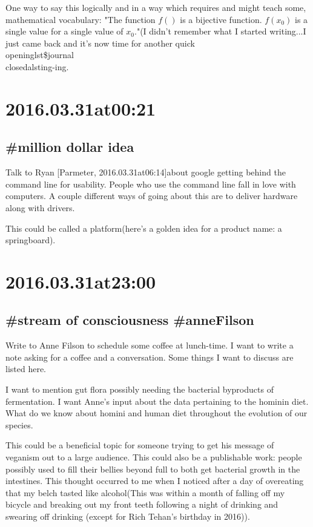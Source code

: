 \begin{enumerate}
\begin{itemize}
One way to say this logically and in a way which requires and might teach some, mathematical vocabulary:
"The function $f()$ is a bijective function. $f(x_0)$ is a single value for a single value of $x_0$."(I didn't remember what I started writing...I just came back and it's now time for another quick \\openinglst\$journal\\closedalsting-ing.
\end{itemize}

\section*{ 2016.03.31at00:21 }
\subsection*{\#{million dollar idea}}
Talk to Ryan [Parmeter, 2016.03.31at06:14]about google getting behind the command line for usability. People who use the command line fall in love with computers. A couple different ways of going about this are to deliver hardware along with drivers.

This could be called a platform(here's a golden idea for a product name: a springboard).

\section*{ 2016.03.31at23:00 }
\subsection*{\#{stream of consciousness} \#anneFilson } 
Write to Anne Filson to schedule some coffee at lunch-time. I want to write a note asking for a coffee and a conversation. Some things I want to discuss are listed here.

I want to mention gut flora possibly needing the bacterial byproducts of fermentation. I want Anne's input about the data pertaining to the hominin diet. What do we know about homini and human diet throughout the evolution of our species.

This could be a beneficial topic for someone trying to get his message of veganism out to a large audience. This could also be a publishable work: people possibly used to fill their bellies beyond full to both get bacterial growth in the intestines. This thought occurred to me when I noticed after a day of overeating that my belch tasted like alcohol(This was within a month of falling off my bicycle and breaking out my front teeth following a night of drinking and swearing off drinking (except for Rich Tehan's birthday in 2016)).


\end{enumerate}
